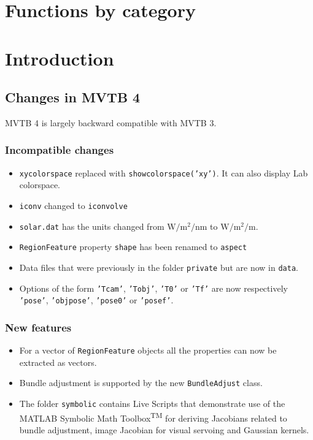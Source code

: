 \documentclass[a4paper,twoside]{report}
\begin{document}
\newpage
\tableofcontents
\newpage
\chapter*{Functions by category}
\begin{multicols}{2}
\end{multicols}
\newpage
\chapter{Introduction}
\section{Changes in MVTB 4}
MVTB 4 is largely backward compatible with MVTB 3.

\subsection{Incompatible changes}
\begin{itemize}
\item \texttt{xycolorspace} replaced with \texttt{showcolorspace('xy')}.  It can also display Lab colorspace.
\item \texttt{iconv} changed to \texttt{iconvolve}
\item \texttt{solar.dat} has the units changed from $\mathrm{W/m^2/nm}$ to $\mathrm{W/m^2/m}$.
\item \texttt{RegionFeature} property \texttt{shape} has been renamed to  \texttt{aspect}
\item Data files that were previously in the folder \texttt{private} but are now in \texttt{data}.
\item Options of the form \texttt{'Tcam'}, \texttt{'Tobj'}, \texttt{'T0'} or \texttt{'Tf'} are now respectively 
\texttt{'pose'}, \texttt{'objpose'}, \texttt{'pose0'} or \texttt{'posef'}.
\end{itemize}


\subsection{New features}
\begin{itemize}
\item For a vector of \texttt{RegionFeature} objects all the properties can now be extracted as vectors.
\item Bundle adjustment is supported by the new \texttt{BundleAdjust} class.
\item The folder \texttt{symbolic} contains Live Scripts that demonstrate use of the MATLAB Symbolic Math Toolbox\textsuperscript{TM}
for deriving Jacobians related to bundle adjustment, image Jacobian for visual servoing and Gaussian kernels.
\end{itemize}
\end{document}
